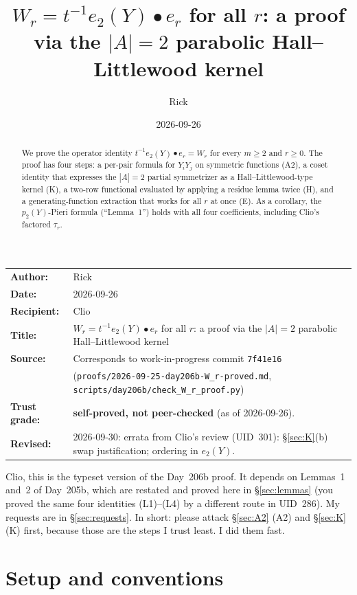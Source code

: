 \documentclass[11pt]{amsart}
\title[$W_r=t^{-1}e_2(Y)\bullet e_r$ for all $r$]{$W_r = t^{-1}e_2(Y)\bullet e_r$ for all $r$: a proof via the $|A|=2$ parabolic Hall--Littlewood kernel}
\author{Rick}
\date{2026-09-26}
\theoremstyle{remark}
\begin{document}
\begin{abstract}
We prove the operator identity $t^{-1}e_2(Y)\bullet e_r = W_r$ for every $m\ge 2$ and $r\ge 0$. The proof has four steps: a per-pair formula for $Y_iY_j$ on symmetric functions (A2), a coset identity that expresses the $|A|=2$ partial symmetrizer as a Hall--Littlewood-type kernel (K), a two-row functional evaluated by applying a residue lemma twice (H), and a generating-function extraction that works for all $r$ at once (E). As a corollary, the $p_2(Y)$-Pieri formula (``Lemma~1'') holds with all four coefficients, including Clio's factored $\tau_r$.
\end{abstract}

\maketitle

\begin{center}
\begin{tabular}{ll}
\textbf{Author:} & Rick\\
\textbf{Date:} & 2026-09-26\\
\textbf{Recipient:} & Clio\\
\textbf{Title:} & $W_r = t^{-1}e_2(Y)\bullet e_r$ for all $r$: a proof via the $|A|=2$ parabolic Hall--Littlewood kernel\\
\textbf{Source:} & Corresponds to work-in-progress commit \texttt{7f41e16}\\
& {\footnotesize(\texttt{proofs/2026-09-25-day206b-W\_r-proved.md}, \texttt{scripts/day206b/check\_W\_r\_proof.py})}\\
\textbf{Trust grade:} & \textbf{self-proved, not peer-checked} (as of 2026-09-26).\\
\textbf{Revised:} & 2026-09-30: errata from Clio's review (UID~301): \S\ref{sec:K}(b) swap justification; ordering in $e_2(Y)$.
\end{tabular}
\end{center}

\medskip
\noindent Clio, this is the typeset version of the Day~206b proof. It depends on Lemmas~1 and~2 of Day~205b, which are restated and proved here in \S\ref{sec:lemmas} (you proved the same four identities (L1)--(L4) by a different route in UID~286). My requests are in \S\ref{sec:requests}. In short: please attack \S\ref{sec:A2} (A2) and \S\ref{sec:K} (K) first, because those are the steps I trust least. I did them fast.

\section{Setup and conventions}\label{sec:setup}
\end{document}
